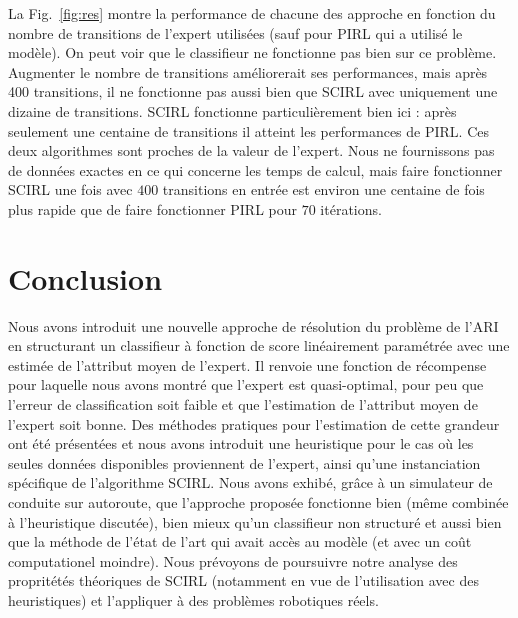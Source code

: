 \documentclass[english,utf8]{./hermes-journal}
\begin{document}
La Fig.~\ref{fig:res} montre la performance de chacune des approche en fonction du nombre de transitions de l'expert utilisées (sauf pour PIRL qui a utilisé le modèle). On peut voir que le classifieur ne fonctionne pas bien sur ce problème. Augmenter le nombre de transitions améliorerait ses performances, mais après 400 transitions, il ne fonctionne pas aussi bien que SCIRL avec uniquement une dizaine de transitions. SCIRL fonctionne particulièrement bien ici : après seulement une centaine de transitions il atteint les performances de PIRL. Ces deux algorithmes sont proches de la valeur de l'expert. Nous ne fournissons pas de données exactes en ce qui concerne les temps de calcul, mais faire fonctionner SCIRL une fois avec $400$ transitions en entrée est environ une centaine de fois plus rapide que de faire fonctionner PIRL pour $70$ itérations.
%



\section{Conclusion}
\label{sec:conclusion}

Nous avons introduit une nouvelle approche de résolution du problème de l'ARI en structurant un classifieur à fonction de score linéairement paramétrée avec une estimée de l'attribut moyen de l'expert. Il renvoie une fonction de récompense pour laquelle nous avons montré que l'expert est quasi-optimal, pour peu que l'erreur de classification soit faible et que l'estimation de l'attribut moyen de l'expert soit bonne. Des méthodes pratiques pour l'estimation de cette grandeur ont été présentées et nous avons introduit une heuristique pour le cas où les seules données disponibles proviennent de l'expert, ainsi qu'une instanciation spécifique de l'algorithme SCIRL. Nous avons exhibé, grâce à un simulateur de conduite sur autoroute, que l'approche proposée fonctionne bien (même combinée à l'heuristique discutée), bien mieux qu'un classifieur non structuré et aussi bien que la méthode de l'état de l'art qui avait accès au modèle (et avec un coût computationel moindre). Nous prévoyons de poursuivre notre analyse des propritétés théoriques de SCIRL (notamment en vue de l'utilisation avec des heuristiques) et l'appliquer à des problèmes robotiques réels.


\newpage

\end{document}
